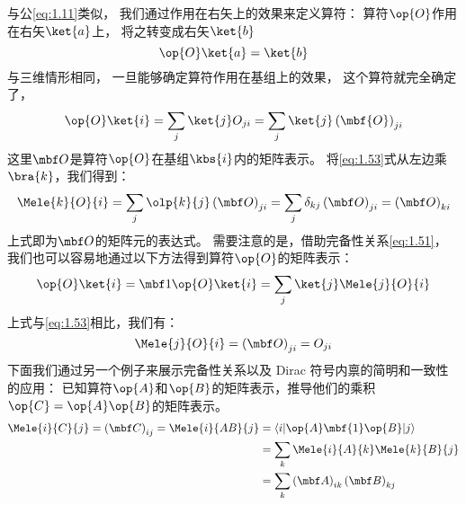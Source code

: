 与公\autoref{eq:1.11}类似，
我们通过作用在右矢上的效果来定义算符：
算符$\op{O}$作用在右矢$\ket{a}$上，
将之转变成右矢$\ket{b}$
\begin{equation}
 \op{O}\ket{a} = \ket{b}
 \label{eq:1.52}
\end{equation}
与三维情形相同，
一旦能够确定算符作用在基组上的效果，
这个算符就完全确定了，
\begin{equation}
 \op{O}\ket{i} = \sum_j\ket{j}O_{ji} = \sum_j\ket{j}\left(\mbf{O}\right)_{ji}
 \label{eq:1.53}
\end{equation}
这里$\mbf O$是算符$\op{O}$在基组$\kbs{i}$内的矩阵表示。
将\autoref{eq:1.53}式从左边乘$\bra{k}$，我们得到：
\begin{equation}
 \Mele{k}{O}{i} = \sum_j\olp{k}{j}\left(\mbf O\right)_{ji} = \sum_j\delta_{kj} \left(\mbf O\right)_{ji} = \left(\mbf O\right)_{ki}
 \label{eq:1.54}
\end{equation}
上式即为$\mbf O$的矩阵元的表达式。
需要注意的是，借助完备性关系\autoref{eq:1.51}，
我们也可以容易地通过以下方法得到算符$\op{O}$的矩阵表示：
\begin{equation}
 \op{O}\ket{i} = {\mbf 1}\op{O}\ket{i} = \sum_j\ket{j}\Mele{j}{O}{i}
 \label{eq:1.55}
\end{equation}
上式与\autoref{eq:1.53}相比，我们有：
\begin{equation}
 \Mele{j}{O}{i} = \left(\mbf O\right)_{ji} = O_{ji}
 \label{eq:1.56}
\end{equation}
下面我们通过另一个例子来展示完备性关系以及 Dirac 符号内禀的简明和一致性的应用：
已知算符$\op{A}$和$\op{B}$的矩阵表示，推导他们的乘积$\op{C} = \op{A}\op{B}$的矩阵表示。
\[
\begin{split}
 \Mele{i}{C}{j} = \left(\mbf C\right)_{ij} = \Mele{i}{AB}{j} &= \left\langle i\middle\vert\op{A}\mbf{1}\op{B}\middle\vert j\right\rangle \\
 &= \sum_k \Mele{i}{A}{k} \Mele{k}{B}{j} \\
 &= \sum_k \left(\mbf A\right)_{ik} \left(\mbf B\right)_{kj}
\end{split}
\]


